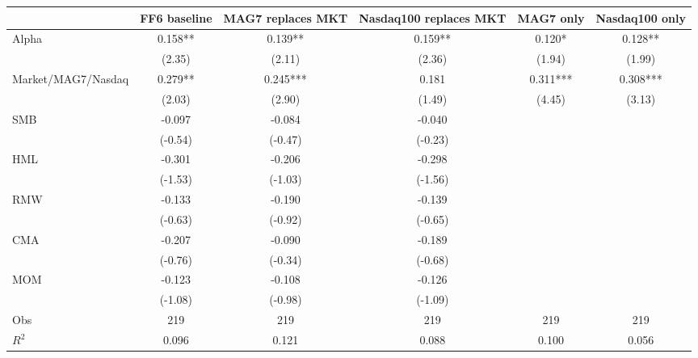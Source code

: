 \begin{tabular}{lccccc}
\toprule
 & FF6 baseline & MAG7 replaces MKT & Nasdaq100 replaces MKT & MAG7 only & Nasdaq100 only \\
\midrule
Alpha & 0.158** & 0.139** & 0.159** & 0.120* & 0.128** \\
 & (2.35) & (2.11) & (2.36) & (1.94) & (1.99) \\
Market/MAG7/Nasdaq & 0.279** & 0.245*** & 0.181 & 0.311*** & 0.308*** \\
 & (2.03) & (2.90) & (1.49) & (4.45) & (3.13) \\
SMB & -0.097 & -0.084 & -0.040 &  &  \\
 & (-0.54) & (-0.47) & (-0.23) &  &  \\
HML & -0.301 & -0.206 & -0.298 &  &  \\
 & (-1.53) & (-1.03) & (-1.56) &  &  \\
RMW & -0.133 & -0.190 & -0.139 &  &  \\
 & (-0.63) & (-0.92) & (-0.65) &  &  \\
CMA & -0.207 & -0.090 & -0.189 &  &  \\
 & (-0.76) & (-0.34) & (-0.68) &  &  \\
MOM & -0.123 & -0.108 & -0.126 &  &  \\
 & (-1.08) & (-0.98) & (-1.09) &  &  \\
Obs & 219 & 219 & 219 & 219 & 219 \\
$R^2$ & 0.096 & 0.121 & 0.088 & 0.100 & 0.056 \\
\bottomrule
\end{tabular}
